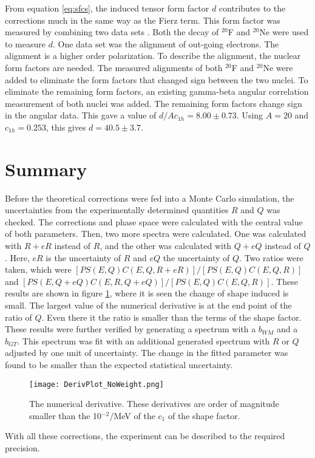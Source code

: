 \documentclass[../MaxHughesThesis.tex]{subfiles}
\begin{document}
From equation \ref{eq:sfcs}, the induced tensor form factor $d$ contributes to the corrections much in the same way as the Fierz term.
This form factor was measured by combining two data sets \cite{Min11}.
Both the decay of $^{20}$F and $^{20}$Ne were used to measure $d$.
One data set was the alignment of out-going electrons.
The alignment is a higher order polarization.
To describe the alignment, the nuclear form factors are needed.  
The measured alignments of both $^{20}$F and $^{20}$Ne were added to eliminate the form factors that changed sign between the two nuclei.
To eliminate the remaining form factors, an existing gamma-beta angular correlation measurement of both nuclei was added. 
The remaining form factors change sign in the angular data.
This gave a value of $d/Ac_{1h} = 8.00 \pm 0.73$.
Using $A = 20$ and $c_{1h} = 0.253$, this gives $d = 40.5 \pm 3.7$. 

\section{Summary}

Before the theoretical corrections were fed into a Monte Carlo simulation, the uncertainties from the experimentally determined quantities $R$ and $Q$ was checked.
The corrections and phase space were calculated with the central value of both parameters.
Then, two more spectra were calculated.
One was calculated with $R + eR$ instead of $R$, and the other was calculated with $Q + eQ$ instead of $Q$.
Here, $eR$ is the uncertainty of $R$ and $eQ$ the uncertainty of $Q$.
Two ratios were taken, which were $[PS(E,Q)C(E,Q,R+eR)]/[PS(E,Q)C(E,Q,R)]$ and $[PS(E,Q+eQ)C(E,R,Q+eQ)]/[PS(E,Q)C(E,Q,R)]$.
These results are shown in figure \ref{fig:theoryuncer}, where it is seen the change of shape induced is small.
The largest value of the numerical derivative is at the end point of the ratio of  $Q$. 
Even there it the ratio is smaller than the terms of the shape factor.
These results were further verified by generating a spectrum with a $b_{WM}$ and a $b_{GT}$.
This spectrum was fit with an additional generated spectrum with $R$ or $Q$ adjusted by one unit of uncertainty.
The change in the fitted parameter was found to be smaller than the expected statistical uncertainty.

\begin{figure}[!htb]
	\centerline{\texttt{[image: DerivPlot\_NoWeight.png]}}
	\caption{The numerical derivative.
		 These derivatives are order of magnitude smaller than the 10$^{-2}$/MeV of the $c_{1}$ of the shape factor.}
	\label{fig:theoryuncer}
\end{figure}
With all these corrections, the experiment can be described to the required precision.
\end{document}
